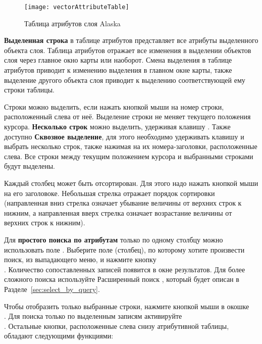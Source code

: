 \begin{figure}[ht]
   \centering
   \texttt{[image: vectorAttributeTable]}
   \caption{Таблица атрибутов слоя Alaska \wincaption}\label{fig:attributetable}
\end{figure}


\textbf{Выделенная строка} в таблице атрибутов представляет все атрибуты
выделенного объекта слоя. Таблица атрибутов отражает все изменения в
выделении объектов слоя через главное окно карты или наоборот. Смена
выделения в таблице атрибутов приводит к изменению выделения в главном
окне карты, также выделение другого объекта слоя приводит к выделению
соответствующей ему строки таблицы.

Строки можно выделить, если нажать кнопкой мыши на номер строки, расположенный
слева от неё. Выделение строки не меняет текущего положения курсора.
\textbf{Несколько строк} можно выделить, удерживая клавишу .
Также доступно \textbf{Сквозное выделение}, для этого необходимо
удерживать клавишу  и выбрать несколько строк, также
нажимая на их номера-заголовки, расположенные слева. Все строки между
текущим положением курсора и выбранными строками будут выделены.

Каждый столбец может быть отсортирован. Для этого надо нажать кнопкой мыши
на его заголовоке. Небольшая стрелка отражает порядок сортировки (направленная
вниз стрелка означает убывание величины от верхних строк к нижним, а
направленная вверх стрелка означает возрастание величины от верхних строк
к нижним).

Для \textbf{простого поиска по атрибутам} только по одному столбцу можно
использовать поле . Выберите поле (столбец), по которому
хотите произвести поиск, из выпадающего меню, и нажмите кнопку \\ .
Количество сопоставленных записей появится в окне результатов. Для более
сложного поиска используйте Расширенный поиск , который будет
описан в Разделе~\ref{sec:select_by_query}.

Чтобы отобразить только выбранные строки, нажмите кнопкой мыши в окошке \\
. Для поиска только по выделенным
записям активируйте \\
. Остальные
кнопки, расположенные слева снизу атрибутивной таблицы, обладают следующими
функциями:

